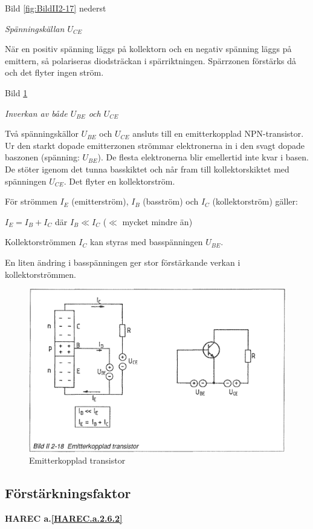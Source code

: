 Bild \ref{fig:BildII2-17} nederst

\emph{Spänningskällan \(U_{CE}\)}

När en positiv spänning läggs på kollektorn och en negativ spänning läggs på
emittern, så polariseras diodsträckan i spärriktningen. Spärrzonen förstärks då
och det flyter ingen ström.

Bild \ref{fig:BildII2-18}

\emph{Inverkan av både \(U_{BE}\) och \(U_{CE}\)}

Två spänningskällor \(U_{BE}\) och \(U_{CE}\) ansluts till en emitterkopplad NPN-transistor.
Ur den starkt dopade emitterzonen strömmar elektronerna in i den svagt dopade
baszonen (spänning: \(U_{BE}\)). De flesta elektronerna blir emellertid inte
kvar i basen. De stöter igenom det tunna basskiktet och når fram till
kollektorskiktet med spänningen \(U_{CE}\). Det flyter en kollektorström.

För strömmen \(I_E\) (emitterström), \(I_B\) (basström) och \(I_C\)
(kollektorström) gäller:

\(I_E = I_B + I_C\) där \(I_B \ll I_C\) (\(\ll\) mycket mindre än)

Kollektorströmmen \(I_C\) kan styras med basspänningen \(U_{BE}\).

En liten ändring i basspänningen ger stor förstärkande verkan i
kollektorströmmen.

\begin{figure}
\includegraphics[width=\textwidth]{images/bild_2_2-18}
\caption{Emitterkopplad transistor}
\label{fig:BildII2-18}
\end{figure}

\subsection{Förstärkningsfaktor}
\textbf{HAREC a.\ref{HAREC.a.2.6.2}\label{myHAREC.a.2.6.2}}

